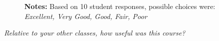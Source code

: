 \begin{boenumerate}
\begin{figure}[h!]\centering
{}\hspace{0.5cm}
\begin{center}
\begin{minipage}[t]{0.85\columnwidth}\vspace{-0.75cm}
\item\scriptsize{\textbf{Notes:} Based on 10 student responses, possible choices were: \emph{Excellent, Very Good, Good, Fair, Poor}}
\end{minipage}
\end{center}
\end{figure}
\FloatBarrier
\newpage
\item \textit{Relative to your other classes, how useful was this course?}


\end{boenumerate}
